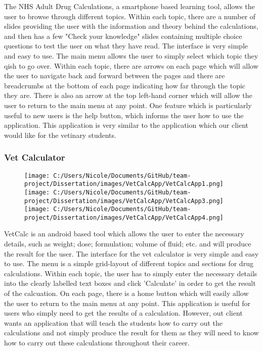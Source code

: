 \documentclass{l3proj}
\begin{document}
The NHS Adult Drug Calculations, a smartphone based learning tool, allows the user to browse through different topics. Within each topic, there are a number of slides providing the user with the information and theory behind the calculations, and then has a few "Check your knowledge" slides containing multiple choice questions to test the user on what they have read. The interface is very simple and easy to use. The main menu allows the user to simply select which topic they qish to go over. Within each topic, there are arrows on each page which will allow the user to navigate back and forward between the pages and there are breadcrumbs at the bottom of each page indicating how far through the topic they are.  There is also an arrow at the top left-hand corner which will allow the user to return to the main menu at any point. One feature which is particularly useful to new users is the help button, which informs the user how to use the application. This application is very similar to the application which our client would like for the vetinary students.

\subsubsection{Vet Calculator}

\begin{figure}[!htb]
  \texttt{[image: C:/Users/Nicole/Documents/GitHub/team-project/Dissertation/images/VetCalcApp/VetCalcApp1.png]}
\endminipage\hfill
{}
  \texttt{[image: C:/Users/Nicole/Documents/GitHub/team-project/Dissertation/images/VetCalcApp/VetCalcApp3.png]}
\endminipage\hfill
{}%
  \texttt{[image: C:/Users/Nicole/Documents/GitHub/team-project/Dissertation/images/VetCalcApp/VetCalcApp4.png]}
\endminipage
\end{figure}

VetCalc is an android based tool which allows the user to enter the necessary details, such as weight; dose; formulation; volume of fluid; etc. and will produce the result for the user. The interface for the vet calculator is very simple and easy to use. The menu is a simple grid-layout of different topics and sections for drug calculations. Within each topic, the user has to simply enter the necessary details into the clearly labelled text boxes and click 'Calculate' in order to get the result of the calcuation. On each page, there is a home button which will easily allow the user to return to the main menu at any point. This application is useful for users who simply need to get the results of a calculation. However, out client wants an application that will teach the students how to carry out the calculations and not simply produce the result for them as they will need to know how to carry out these calculations throughout their career.
\end{document}
